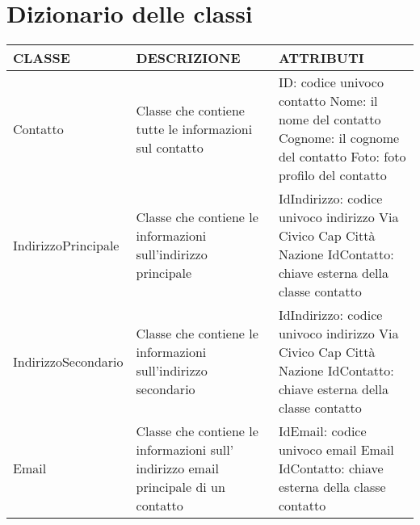 \documentclass{article}
\begin{document}
    \section{\LARGE Dizionario delle classi}
        \begin{tabular}{| m{3cm} | m{6cm}| m{6cm} |}
            \hline
            \textbf{CLASSE} &\textbf{DESCRIZIONE} & \textbf{ATTRIBUTI}\\
            \hline
            Contatto & Classe che contiene tutte le informazioni sul contatto &
            ID: codice univoco contatto\newline
            Nome: il nome del contatto\newline
            Cognome: il cognome del contatto\newline
            Foto: foto profilo del contatto\\
            \hline
            IndirizzoPrincipale & Classe che contiene le informazioni sull'indirizzo principale &
            IdIndirizzo: codice univoco indirizzo\newline
            Via\newline
            Civico\newline
            Cap\newline
            Città\newline
            Nazione\newline
            IdContatto: chiave esterna della classe contatto\newline\\
            \hline
            IndirizzoSecondario & Classe che contiene le informazioni sull'indirizzo secondario &
            IdIndirizzo: codice univoco indirizzo\newline
            Via\newline
            Civico\newline
            Cap\newline
            Città\newline
            Nazione\newline
            IdContatto: chiave esterna della classe contatto\newline\\
            \hline
            Email & Classe che contiene le informazioni sull' indirizzo email principale di un contatto &
            IdEmail: codice univoco email\newline
            Email\newline
            IdContatto: chiave esterna della classe contatto\\

\end{tabular}
\end{document}

